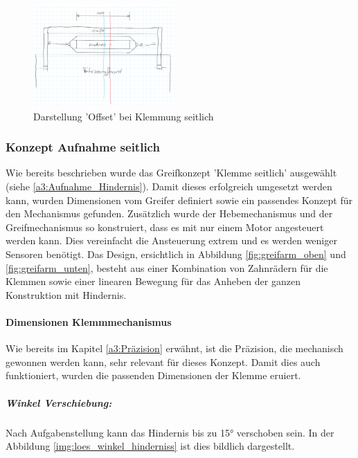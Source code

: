 \documentclass[../main.tex]{subfiles}
\begin{document}
        \begin{figure}[h!]
            \centering
            \includegraphics[width=0.48\textwidth]{img/konzeptfindung/Klemme_Langsweg_off_center.png}
            \caption{Darstellung 'Offset' bei Klemmung seitlich}
        \label{img:konzept_zentrierung_3}
        \end{figure}  

\newpage

\subsubsection{Konzept Aufnahme seitlich}
\label{a3:Aufnahme_seitlich}
Wie bereits beschrieben wurde das Greifkonzept 'Klemme seitlich' ausgewählt (siehe \ref{a3:Aufnahme_Hindernis}).
Damit dieses erfolgreich umgesetzt werden kann, wurden Dimensionen vom Greifer definiert  sowie ein passendes Konzept für den Mechanismus gefunden. Zusätzlich wurde der Hebemechanismus und der Greifmechanismus so konstruiert, dass es mit nur einem Motor angesteuert werden kann. Dies vereinfacht die Ansteuerung extrem und es werden weniger Sensoren benötigt.
Das Design, ersichtlich in Abbildung \ref{fig:greifarm_oben} und \ref{fig:greifarm_unten}, besteht aus einer Kombination von Zahnrädern für die Klemmen sowie einer linearen Bewegung für das Anheben der ganzen Konstruktion mit Hindernis.

\paragraph{Dimensionen Klemmmechanismus}
Wie bereits im Kapitel \ref{a3:Präzision} erwähnt, ist die Präzision, die mechanisch gewonnen werden kann, sehr relevant für dieses Konzept. Damit dies auch funktioniert, wurden die passenden Dimensionen der Klemme eruiert. 

\subparagraph{Winkel Verschiebung:} \label{loes:winkel_verschiebung}
Nach Aufgabenstellung kann das Hindernis bis zu 15° verschoben sein.
In der Abbildung \ref{img:loes_winkel_hinderniss} ist dies bildlich dargestellt.
\end{document}
